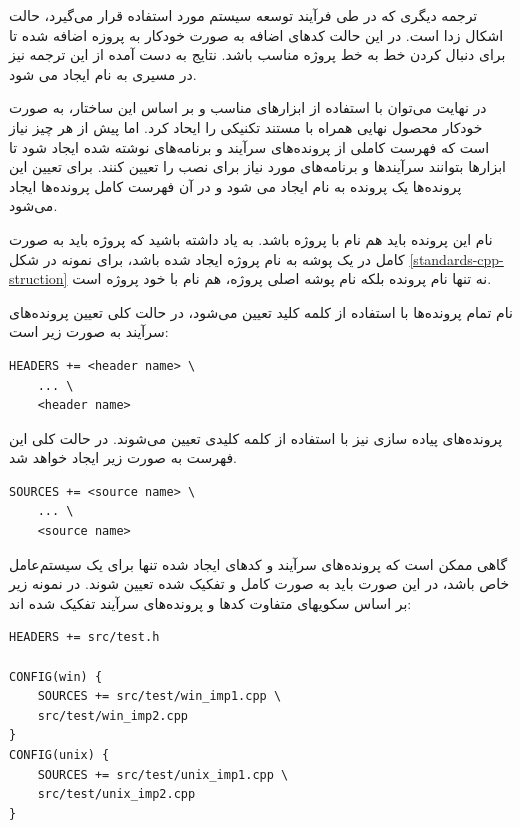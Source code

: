 ترجمه دیگری که در طی فرآیند توسعه سیستم مورد استفاده قرار می‌گیرد، حالت اشکال
زدا است. در این حالت کدهای اضافه به صورت خودکار به پروزه اضافه شده تا برای دنبال
کردن خط به خط پروژه مناسب باشد. نتایج به دست آمده از این ترجمه نیز در مسیری به
نام  ایجاد می شود.

در نهایت می‌توان با استفاده از ابزارهای مناسب و بر اساس این ساختار، به صورت
خودکار محصول نهایی همراه با مستند تکنیکی را ایحاد کرد. اما پیش از هر چیز نیاز
است که فهرست کاملی از پرونده‌های سرآیند و برنامه‌های نوشته شده ایجاد شود تا
ابزارها بتوانند سرآیندها و برنامه‌های مورد نیاز برای نصب را تعیین کنند. برای
تعیین این پرونده‌ها یک پرونده به نام  ایجاد می شود و در
آن فهرست کامل پرونده‌ها ایجاد می‌شود.

\begin{note}
نام این پرونده باید هم نام با پروژه باشد. به یاد داشته باشید که پروژه باید به
صورت کامل در یک پوشه به نام پروژه ایجاد شده باشد، برای نمونه در شکل
\ref{standards-cpp-struction} نه تنها نام پرونده  بلکه نام پوشه اصلی
پروژه، هم نام با خود پروژه است.
\end{note}

نام تمام پرونده‌ها با استفاده از کلمه کلید  تعیین می‌شود، در حالت
کلی تعیین پرونده‌های سرآیند به صورت زیر است:

\begin{latin}
\lstset{language=C++}  
\begin{lstlisting}[frame=single] 
HEADERS += <header name> \ 
	... \
	<header name>
\end{lstlisting}
\end{latin}

پرونده‌های پیاده سازی نیز با استفاده از کلمه کلیدی  تعیین می‌شوند.
در حالت کلی این فهرست به صورت زیر ایجاد خواهد شد.

\begin{latin}
\lstset{language=C++}  
\begin{lstlisting}[frame=single] 
SOURCES += <source name> \ 
	... \
	<source name>
\end{lstlisting}
\end{latin}

گاهی ممکن است که پرونده‌های سرآیند و کدهای ایجاد شده تنها برای یک سیستم‌عامل خاص
باشد، در این صورت باید به صورت کامل و تفکیک شده تعیین شوند. در نمونه زیر بر اساس
سکویهای متفاوت کدها و پرونده‌های سرآیند تفکیک شده اند:

\begin{latin}
\lstset{language=C++}  
\begin{lstlisting}[frame=single] 
HEADERS += src/test.h

CONFIG(win) { 
    SOURCES += src/test/win_imp1.cpp \
	src/test/win_imp2.cpp
}
CONFIG(unix) { 
    SOURCES += src/test/unix_imp1.cpp \
	src/test/unix_imp2.cpp
}
\end{lstlisting}
\end{latin}

